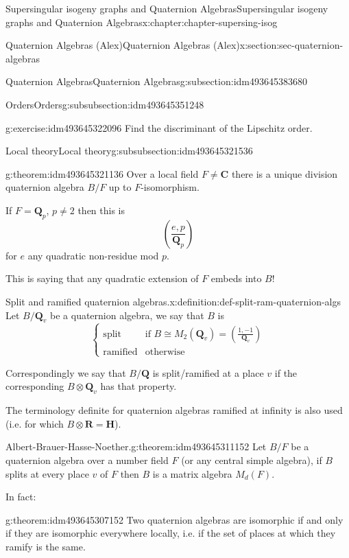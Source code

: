 \documentclass[oneside,10pt,]{book}
\numberwithin{equation}{section}
\newcommand{\legendre}[2]{\left(\frac{#1}{#2}\right)}
\newcommand{\QQ}{\mathbf{Q}}
\newcommand{\RR}{\mathbf{R}}
\newcommand{\CC}{\mathbf{C}}
\newcommand{\HH}{\mathbf{H}}
\newcommand{\amp}{&}
\begin{document}
\begin{chapterptx}{Supersingular isogeny graphs and Quaternion Algebras}{}{Supersingular isogeny graphs and Quaternion Algebras}{}{}{x:chapter:chapter-supersing-isog}
\begin{sectionptx}{Quaternion Algebras (Alex)}{}{Quaternion Algebras (Alex)}{}{}{x:section:sec-quaternion-algebras}
\begin{subsectionptx}{Quaternion Algebras}{}{Quaternion Algebras}{}{}{g:subsection:idm493645383680}
\begin{subsubsectionptx}{Orders}{}{Orders}{}{}{g:subsubsection:idm493645351248}
\begin{inlineexercise}{}{g:exercise:idm493645322096}
Find the discriminant of the Lipschitz order.%
\end{inlineexercise}
\end{subsubsectionptx}
%
%
\typeout{************************************************}
\typeout{************************************************}
%
\begin{subsubsectionptx}{Local theory}{}{Local theory}{}{}{g:subsubsection:idm493645321536}
\begin{theorem}{}{}{g:theorem:idm493645321136}%
Over a local field \(F \ne \CC\) there is a unique division quaternion algebra \(B/F\) up to \(F\)-isomorphism.%
\par
If \(F = \QQ_p\), \(p\ne 2\) then this is%
\begin{equation*}
\legendre{e,p}{\QQ_p}
\end{equation*}
for \(e\) any quadratic non-residue mod \(p\).%
\par
This is saying that any quadratic extension of \(F\) embeds into \(B\)!%
\end{theorem}
\begin{definition}{Split and ramified quaternion algebras.}{x:definition:def-split-ram-quaternion-algs}%
Let \(B/\QQ_v\) be a quaternion algebra, we say that \(B\) is%
\begin{equation*}
\begin{cases}
\text{split} \amp \text{if } B\cong M_2(\QQ_v)  = \legendre{1,-1}{\QQ_v}\\
\text{ramified} \amp \text{otherwise}
\end{cases}
\end{equation*}
%
\par
Correspondingly we say that \(B/\QQ\) is split\slash{}ramified at a place \(v\) if the corresponding \(B\otimes \QQ_v\) has that property.%
\end{definition}
The terminology definite for quaternion algebras ramified at infinity is also used (i.e. for which \(B\otimes \RR = \HH\)).%
\begin{theorem}{Albert-Brauer-Hasse-Noether.}{}{g:theorem:idm493645311152}%
Let \(B/F\) be a quaternion algebra  over  a  number field \(F\) (or any central simple algebra), if \(B\) splits at every place \(v\) of \(F\) then \(B\) is a matrix algebra \(M_d (F)\).%
\end{theorem}
In fact:%
\begin{theorem}{}{}{g:theorem:idm493645307152}%
Two quaternion algebras are isomorphic if and only if they are isomorphic everywhere locally, i.e. if the set of places at which they ramify is the same.%

\end{theorem}
\end{subsubsectionptx}
\end{subsectionptx}
\end{sectionptx}
\end{chapterptx}
\end{document}
